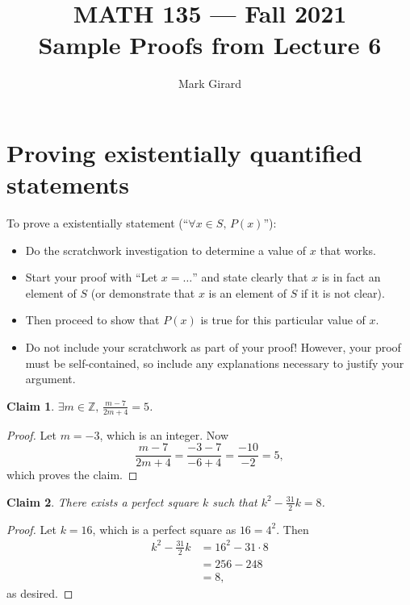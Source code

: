 \documentclass[11pt]{article}
\theoremstyle{plain}
\newtheorem*{claim}{Claim}
\theoremstyle{plain}
\theoremstyle{remark}
\def\integers{\mathbb{Z}}
\begin{document}
\title{MATH 135 --- Fall 2021\\ Sample Proofs from Lecture 6}
\author{Mark Girard}

\maketitle

\section*{Proving existentially quantified statements}

To prove a existentially statement (``$\forall x\in S,\, P(x)$''):

\begin{itemize}
 \item Do the scratchwork investigation to determine a value of $x$ that works.
 \item Start your proof with ``Let $x=\dots$'' and state clearly that $x$ is in fact an element of $S$ (or demonstrate that $x$ is an element of $S$ if it is not clear).
 \item Then proceed to show that $P(x)$ is true for this particular value of $x$.
 \item Do not include your scratchwork as part of your proof! However, your proof must be self-contained, so include any explanations necessary to justify your argument.

\end{itemize}

\begin{tcolorbox}
\begin{claim}
 $\exists m\in\integers,\, \frac{m-7}{2m+4}=5$.
\end{claim}
\end{tcolorbox}

\begin{proof}
 Let $m=-3$, which is an integer. Now
 \begin{equation*}
  \frac{m-7}{2m+4} = \frac{-3-7}{-6+4} = \frac{-10}{-2} = 5,
 \end{equation*}
 which proves the claim.

\end{proof}

\begin{tcolorbox}
\begin{claim}
 There exists a perfect square $k$ such that $k^2-\frac{31}{2}k = 8$.
\end{claim}
\end{tcolorbox}
\begin{proof}
 Let $k=16$, which is a perfect square as $16=4^2$. Then
 \begin{align*}
  k^2 - \frac{31}{2}k &= 16^2 - 31\cdot 8\\& = 256 - 248 \\&= 8, 
 \end{align*}
as desired.
\end{proof}
\end{document}
